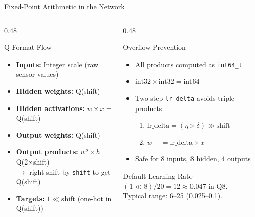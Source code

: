 \documentclass[aspectratio=169, 10pt]{beamer}
\begin{document}
\begin{frame}{Fixed-Point Arithmetic in the Network}
\begin{columns}[T]
\begin{column}{0.48\textwidth}
\begin{block}{Q-Format Flow}
\begin{itemize}
  \item \textbf{Inputs:} Integer scale (raw sensor values)
  \item \textbf{Hidden weights:} Q(shift)
  \item \textbf{Hidden activations:} $w \times x$ = Q(shift)
  \item \textbf{Output weights:} Q(shift)
  \item \textbf{Output products:} $w^o \times h = $ Q(2$\times$shift)\\
    $\rightarrow$ right-shift by \texttt{shift} to get Q(shift)
  \item \textbf{Targets:} $1 \ll \text{shift}$ (one-hot in Q(shift))
\end{itemize}
\end{block}
\end{column}

\begin{column}{0.48\textwidth}
\begin{block}{Overflow Prevention}
\begin{itemize}
  \item All products computed as \texttt{int64\_t}
  \item $\text{int32} \times \text{int32} = \text{int64}$
  \item Two-step \texttt{lr\_delta} avoids triple products:
    \begin{enumerate}
      \item $\text{lr\_delta} = (\eta \times \delta) \gg \text{shift}$
      \item $w \mathrel{-}= \text{lr\_delta} \times x$
    \end{enumerate}
  \item Safe for 8 inputs, 8 hidden, 4 outputs
\end{itemize}
\end{block}

\vspace{0.3em}
\begin{block}{Default Learning Rate}
$(1 \ll 8) / 20 = 12 \approx 0.047$ in Q8.\\
Typical range: 6--25 (0.025--0.1).
\end{block}
\end{column}
\end{columns}
\end{frame}
\end{document}
